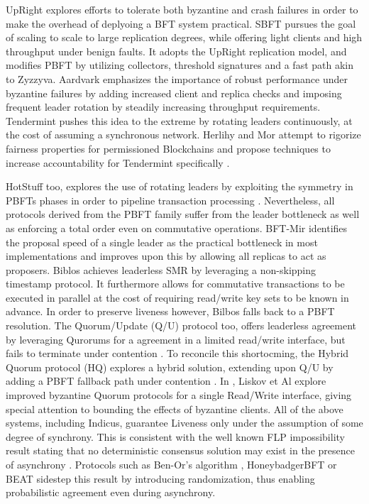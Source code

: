 UpRight explores efforts to tolerate both byzantine and crash failures in order to make the overhead of deplyoing a BFT system practical.
SBFT \cite{gueta2018sbft} pursues the goal of scaling to scale to large replication degrees, while offering light clients and high throughput under benign faults. It adopts the UpRight replication model, and modifies PBFT by utilizing collectors, threshold signatures and a fast path akin to Zyzzyva. 
Aardvark \cite{clement2009making} emphasizes the importance of robust performance under byzantine failures by adding increased client and replica checks and imposing frequent leader rotation by steadily increasing throughput requirements. Tendermint \cite{buchman2016tendermint} pushes this idea to the extreme by rotating leaders continuously, at the cost of assuming a synchronous network. Herlihy and Mor attempt to rigorize fairness properties for permissioned Blockchains and propose techniques to increase accountability for Tendermint specifically \cite{herlihy2016enhancing}.

HotStuff too, explores the use of rotating leaders by exploiting the symmetry in PBFTs phases in order to pipeline transaction processing \cite{yin2019hotstuff}. 
Nevertheless, all protocols derived from the PBFT family suffer from the leader bottleneck as well as enforcing a total order even on commutative operations. BFT-Mir \cite{stathakopoulou2019mir} identifies the proposal speed of a single leader as the practical bottleneck in most implementations and improves upon this by allowing all replicas to act as proposers.
Biblos \cite{bazzi2018clairvoyant} achieves leaderless SMR by leveraging a non-skipping timestamp protocol. It furthermore allows for commutative transactions to be executed in parallel at the cost of requiring read/write key sets to be known in advance. In order to preserve liveness however, Bilbos falls back to a PBFT resolution. 
The Quorum/Update (Q/U) protocol too, offers leaderless agreement by leveraging Qurorums for a agreement in a limited read/write interface, but fails to terminate under contention \cite{abd2005fault}. To reconcile this shortocming, the Hybrid Quorum protocol (HQ) explores a hybrid solution, extending upon Q/U by adding a PBFT fallback path under contention \cite{cowling2006hq}. In \cite{liskov2006tolerating}, Liskov et Al explore improved byzantine Quorum protocols for a single Read/Write interface, giving special attention to bounding the effects of byzantine clients. 
All of the above systems, including Indicus, guarantee Liveness only under the assumption of some degree of synchrony. This is consistent with the well known FLP impossibility result stating that no deterministic consensus solution may exist in the presence of asynchrony \cite{fischer1985impossibility}. Protocols such as Ben-Or's algorithm \cite{ben1983another}, HoneybadgerBFT \cite{miller2016honey} or BEAT \cite{duan2018beat} sidestep this result by introducing randomization, thus enabling probabilistic agreement even during asynchrony.

